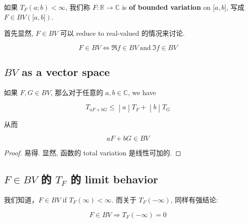 \begin{definition}{}

如果 \(T_{F}(a;b) < \infty\), 我们称 \(F:\mathbb{R}\rightarrow\mathbb{C}\) is \textbf{of bounded variation} on \(\lbrack a,b\rbrack\), 写成 \(F \in BV(\lbrack a,b\rbrack)\).

\end{definition}

首先显然, \(F \in BV\) 可以 reduce to real-valued 的情况来讨论.

\begin{proposition}

\[F \in BV\Leftrightarrow\Re f \in BV\ \text{and}\ \Im f \in BV\]

\end{proposition}

\subsection{\texorpdfstring{\(BV\) as a vector space}{BV as a vector space}}\label{bv-as-a-vector-space}

\begin{lemma}{}

如果 \(F,G \in BV\), 那么对于任意的 \(a,b \in \mathbb{C}\), we have

\[\left. T_{aF + bG} \leq \middle| a \middle| T_{F} + \middle| b \middle| T_{G} \right.\]

从而

\[aF + bG \in BV\]

\end{lemma}

\begin{proof}

易得. 显然, 函数的 total variation 是线性可加的.

\end{proof}

\subsection{\texorpdfstring{\(F \in BV\) 的 \(T_{F}\) 的 limit behavior}{F \textbackslash in BV 的 T\_\{F\} 的 limit behavior}}

我们知道，\(F \in BV\) if \(T_{F}(\infty) < \infty\). 而关于 \(T_{F}( - \infty)\), 同样有强结论:

\begin{proposition}

\[F \in BV\Longrightarrow T_{F}( - \infty) = 0\]

\end{proposition}

